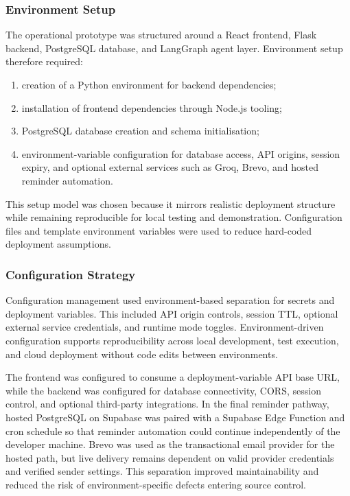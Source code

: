 \documentclass[12pt]{article}
\begin{document}
\subsubsection{Environment Setup}
The operational prototype was structured around a React frontend, Flask backend, PostgreSQL database, and LangGraph agent layer. Environment setup therefore required:
\begin{enumerate}
    \item creation of a Python environment for backend dependencies;
    \item installation of frontend dependencies through Node.js tooling;
    \item PostgreSQL database creation and schema initialisation;
    \item environment-variable configuration for database access, API origins, session expiry, and optional external services such as Groq, Brevo, and hosted reminder automation.
\end{enumerate}

This setup model was chosen because it mirrors realistic deployment structure while remaining reproducible for local testing and demonstration. Configuration files and template environment variables were used to reduce hard-coded deployment assumptions.

\subsubsection{Configuration Strategy}
Configuration management used environment-based separation for secrets and deployment variables. This included API origin controls, session TTL, optional external service credentials, and runtime mode toggles. Environment-driven configuration supports reproducibility across local development, test execution, and cloud deployment without code edits between environments.

The frontend was configured to consume a deployment-variable API base URL, while the backend was configured for database connectivity, CORS, session control, and optional third-party integrations. In the final reminder pathway, hosted PostgreSQL on Supabase was paired with a Supabase Edge Function and cron schedule so that reminder automation could continue independently of the developer machine. Brevo was used as the transactional email provider for the hosted path, but live delivery remains dependent on valid provider credentials and verified sender settings. This separation improved maintainability and reduced the risk of environment-specific defects entering source control.
\end{document}
